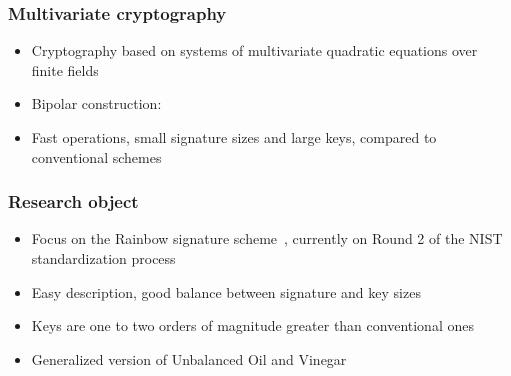 \documentclass[12pt]{beamer}
\begin{document}
\begin{frame}
  \frametitle{Multivariate cryptography}
  \begin{itemize}
    \item Cryptography based on systems of multivariate quadratic equations
        over finite fields
    \item Bipolar construction:
    \begin{figure}
      \vspace{2mm}
      \centering
    \end{figure}
    \item Fast operations, small signature sizes and large keys, compared to
        conventional schemes
  \end{itemize}
\end{frame}

\begin{frame}
  \frametitle{Research object}
  \begin{itemize}
    \item Focus on the Rainbow signature scheme~\cite{Ding:inproc:2005:jun},
        currently on Round 2 of the NIST standardization process
    \item Easy description, good balance between signature and key sizes
    \item Keys are one to two orders of magnitude greater than
        conventional ones
    \item Generalized version of Unbalanced Oil and
        Vinegar~\cite{Kipnis:inproc:1999:apr}
  \end{itemize}
\end{frame}
\end{document}
